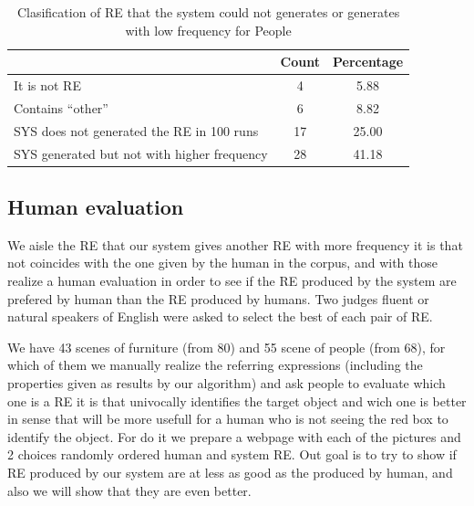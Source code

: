 \begin{table}[h!]
\begin{center}
\begin{tabular}{|l|c|c|}
\hline
			& Count		& Percentage\\
\hline
It is not RE		&	4	&	5.88 \\
Contains ``other''	&	6	&	8.82 \\
\hline
SYS does not generated the RE in 100 runs	&	17	&	25.00 \\
SYS generated but not with higher frequency	&	28	&	41.18 \\

\hline
\end{tabular}
\caption{Clasification of RE that the system could not generates or generates with low frequency for People}
\label{error-furniture}
\end{center}
\end{table}
\subsection{Human evaluation} \label{sec:humanevaluation}

We aisle the RE that our system gives another RE with more frequency it is that not coincides with the one given by the human in the corpus, and with those realize a human evaluation in order to see if the RE produced by the system are prefered by human than the RE produced by humans. Two judges fluent or natural speakers of English were asked to select the best of each pair of RE.

We have 43 scenes of furniture (from 80) and 55 scene of people (from 68), for which of them we manually realize the referring expressions (including the properties given as results by our algorithm) and ask people to evaluate which one is a RE it is that univocally identifies the target object and wich one is better in sense that will be more usefull for a human who is not seeing the red box to identify the object. For do it we prepare a webpage with each of the pictures and 2 choices randomly ordered human and system RE. Out goal is to try to show if RE produced by our system are at less as good as the produced by human, and also we will show that they are even better.


